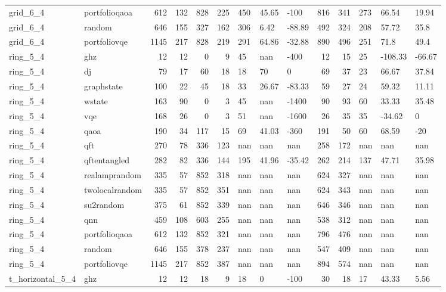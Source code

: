\begin{longtable}{llrrrrlllrrlll}
grid\_6\_4 & portfolioqaoa & 612 & 132 & 828 & 225 & 450 & 45.65 & -100 & 816 & 341 & 273 & 66.54 & 19.94 \\
grid\_6\_4 & random & 646 & 155 & 327 & 162 & 306 & 6.42 & -88.89 & 492 & 324 & 208 & 57.72 & 35.8 \\
grid\_6\_4 & portfoliovqe & 1145 & 217 & 828 & 219 & 291 & 64.86 & -32.88 & 890 & 496 & 251 & 71.8 & 49.4 \\
ring\_5\_4 & ghz & 12 & 12 & 0 & 9 & 45 & nan & -400 & 12 & 15 & 25 & -108.33 & -66.67 \\
ring\_5\_4 & dj & 79 & 17 & 60 & 18 & 18 & 70 & 0 & 69 & 37 & 23 & 66.67 & 37.84 \\
ring\_5\_4 & graphstate & 100 & 22 & 45 & 18 & 33 & 26.67 & -83.33 & 59 & 27 & 24 & 59.32 & 11.11 \\
ring\_5\_4 & wstate & 163 & 90 & 0 & 3 & 45 & nan & -1400 & 90 & 93 & 60 & 33.33 & 35.48 \\
ring\_5\_4 & vqe & 168 & 26 & 0 & 3 & 51 & nan & -1600 & 26 & 35 & 35 & -34.62 & 0 \\
ring\_5\_4 & qaoa & 190 & 34 & 117 & 15 & 69 & 41.03 & -360 & 191 & 50 & 60 & 68.59 & -20 \\
ring\_5\_4 & qft & 270 & 78 & 336 & 123 & nan & nan & nan & 258 & 172 & nan & nan & nan \\
ring\_5\_4 & qftentangled & 282 & 82 & 336 & 144 & 195 & 41.96 & -35.42 & 262 & 214 & 137 & 47.71 & 35.98 \\
ring\_5\_4 & realamprandom & 335 & 57 & 852 & 318 & nan & nan & nan & 624 & 327 & nan & nan & nan \\
ring\_5\_4 & twolocalrandom & 335 & 57 & 852 & 351 & nan & nan & nan & 624 & 343 & nan & nan & nan \\
ring\_5\_4 & su2random & 375 & 61 & 852 & 339 & nan & nan & nan & 646 & 346 & nan & nan & nan \\
ring\_5\_4 & qnn & 459 & 108 & 603 & 255 & nan & nan & nan & 538 & 312 & nan & nan & nan \\
ring\_5\_4 & portfolioqaoa & 612 & 132 & 852 & 321 & nan & nan & nan & 796 & 476 & nan & nan & nan \\
ring\_5\_4 & random & 646 & 155 & 378 & 237 & nan & nan & nan & 547 & 409 & nan & nan & nan \\
ring\_5\_4 & portfoliovqe & 1145 & 217 & 852 & 387 & nan & nan & nan & 894 & 574 & nan & nan & nan \\
t\_horizontal\_5\_4 & ghz & 12 & 12 & 18 & 9 & 18 & 0 & -100 & 30 & 18 & 17 & 43.33 & 5.56 \\

\end{longtable}
